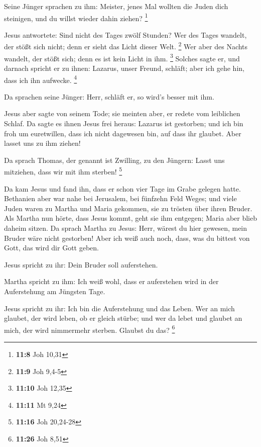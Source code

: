  Seine Jünger sprachen zu ihm: Meister, jenes Mal wollten
die Juden dich steinigen, und du willst wieder dahin ziehen? \footnote{\textbf{11:8}
  Joh 10,31}

 Jesus antwortete: Sind nicht des Tages zwölf Stunden? Wer
des Tages wandelt, der stößt sich nicht; denn er sieht das Licht dieser
Welt. \footnote{\textbf{11:9} Joh 9,4-5}  Wer aber des
Nachts wandelt, der stößt sich; denn es ist kein Licht in ihm.
\footnote{\textbf{11:10} Joh 12,35}  Solches sagte er,
und darnach spricht er zu ihnen: Lazarus, unser Freund, schläft; aber
ich gehe hin, dass ich ihn aufwecke. \footnote{\textbf{11:11} Mt 9,24}

 Da sprachen seine Jünger: Herr, schläft er, so wird's
besser mit ihm.

 Jesus aber sagte von seinem Tode; sie meinten aber, er
redete vom leiblichen Schlaf.  Da sagte es ihnen Jesus
frei heraus: Lazarus ist gestorben;  und ich bin froh um
euretwillen, dass ich nicht dagewesen bin, auf dass ihr glaubet. Aber
lasset uns zu ihm ziehen!

 Da sprach Thomas, der genannt ist Zwilling, zu den
Jüngern: Lasst uns mitziehen, dass wir mit ihm sterben! \footnote{\textbf{11:16}
  Joh 20,24-28}

 Da kam Jesus und fand ihn, dass er schon vier Tage im
Grabe gelegen hatte.  Bethanien aber war nahe bei
Jerusalem, bei fünfzehn Feld Weges;  und viele Juden
waren zu Martha und Maria gekommen, sie zu trösten über ihren Bruder.
 Als Martha nun hörte, dass Jesus kommt, geht sie ihm
entgegen; Maria aber blieb daheim sitzen.  Da sprach
Martha zu Jesus: Herr, wärest du hier gewesen, mein Bruder wäre nicht
gestorben!  Aber ich weiß auch noch, dass, was du bittest
von Gott, das wird dir Gott geben.

 Jesus spricht zu ihr: Dein Bruder soll auferstehen.

 Martha spricht zu ihm: Ich weiß wohl, dass er
auferstehen wird in der Auferstehung am Jüngsten Tage.

 Jesus spricht zu ihr: Ich bin die Auferstehung und das
Leben. Wer an mich glaubet, der wird leben, ob er gleich stürbe;
 und wer da lebet und glaubet an mich, der wird
nimmermehr sterben. Glaubst du das? \footnote{\textbf{11:26} Joh 8,51}

